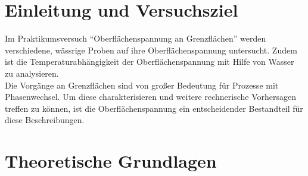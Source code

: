 \section{Einleitung und Versuchsziel}
\label{sec:aufgabenstellung}

Im Praktikumsversuch "`Oberflächenspannung an Grenzflächen"' werden verschiedene, wässrige Proben auf ihre Oberflächenspannung untersucht. Zudem ist die Temperaturabhängigkeit der Oberflächenspannung mit Hilfe von Wasser zu analysieren.\\
Die Vorgänge an Grenzflächen  sind von großer Bedeutung für Prozesse mit Phasenwechsel. Um diese charakterisieren und weitere rechnerische Vorhersagen treffen zu können, ist die Oberflächenspannung ein entscheidender Bestandteil für diese Beschreibungen.

\section*{Theoretische Grundlagen}
